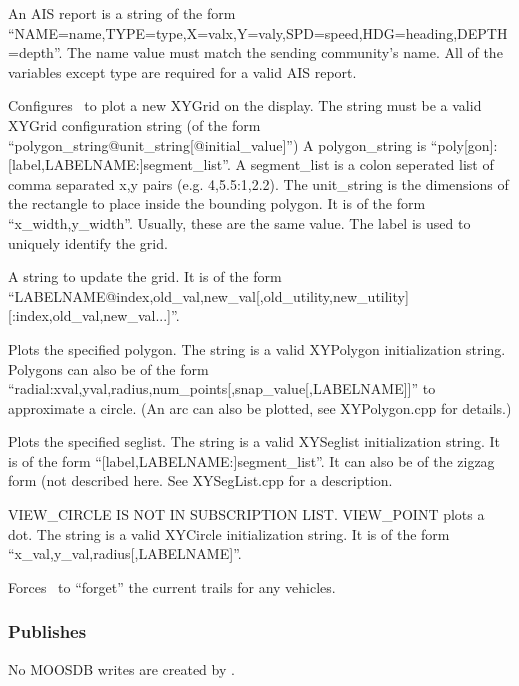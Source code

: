 \begin{hangpar}{\pin}{}
An AIS report is a string of the form ``NAME=name,TYPE=type,X=valx,Y=valy,SPD=speed,HDG=heading,DEPTH=depth''.  The name value must match the sending community's name.  All of the variables except type are required for a valid AIS report.
\end{hangpar}
\begin{hangpar}{\pin}{}
Configures \pmv\ to plot a new XYGrid on the display.  The string must be a valid XYGrid configuration string (of the form ``polygon\_string@unit\_string[@initial\_value]'')  A polygon\_string is ``poly[gon]:[label,LABELNAME:]segment\_list''.  A segment\_list is a colon seperated list of comma separated x,y pairs (e.g. 4,5.5:1,2.2).  The unit\_string is the dimensions of the rectangle to place inside the bounding polygon.  It is of the form ``x\_width,y\_width''.  Usually, these are the same value.  The label is used to uniquely identify the grid.
\end{hangpar}
\begin{hangpar}{\pin}{}
A string to update the grid.  It is of the form ``LABELNAME@index,old\_val,new\_val[,old\_utility,new\_utility][:index,old\_val,new\_val...]''.
\end{hangpar}
\begin{hangpar}{\pin}{}
Plots the specified polygon.  The string is a valid XYPolygon initialization string.  Polygons can also be of the form ``radial:xval,yval,radius,num\_points[,snap\_value[,LABELNAME]]'' to approximate a circle.  (An arc can also be plotted, see XYPolygon.cpp for details.)
\end{hangpar}
\begin{hangpar}{\pin}{}
Plots the specified seglist.  The string is a valid XYSeglist initialization string.  It is of the form ``[label,LABELNAME:]segment\_list''.  It can also be of the zigzag form (not described here.  See XYSegList.cpp for a description.
\end{hangpar}
\begin{hangpar}{\pin}{}
VIEW\_CIRCLE IS NOT IN SUBSCRIPTION LIST.  VIEW\_POINT plots a dot.  The string is a valid XYCircle initialization string.  It is of the form ``x\_val,y\_val,radius[,LABELNAME]''.
\end{hangpar}
\begin{hangpar}{\pin}{}
Forces \pmv\ to ``forget'' the current trails for any vehicles.
\end{hangpar}
\subsubsection{Publishes}
No MOOSDB writes are created by \pmv.
